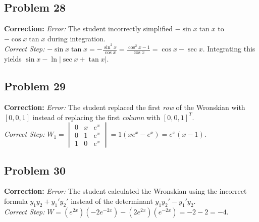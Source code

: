 \documentclass[11pt]{article}
\begin{document}
\subsection*{Problem 28}
\textbf{Correction:} \textit{Error:} The student incorrectly simplified $-\sin x \tan x$ to $-\cos x \tan x$ during integration. \\
\textit{Correct Step:} $-\sin x \tan x = -\frac{\sin^2 x}{\cos x} = \frac{\cos^2 x - 1}{\cos x} = \cos x - \sec x$. Integrating this yields $\sin x - \ln|\sec x + \tan x|$.

\subsection*{Problem 29}
\textbf{Correction:} \textit{Error:} The student replaced the first \textit{row} of the Wronskian with $[0, 0, 1]$ instead of replacing the first \textit{column} with $[0, 0, 1]^T$. \\
\textit{Correct Step:} $W_1 = \begin{vmatrix} 0 & x & e^x \\ 0 & 1 & e^x \\ 1 & 0 & e^x \end{vmatrix} = 1(xe^x - e^x) = e^x(x-1)$.

\subsection*{Problem 30}
\textbf{Correction:} \textit{Error:} The student calculated the Wronskian using the incorrect formula $y_1 y_2 + y_1' y_2'$ instead of the determinant $y_1 y_2' - y_1' y_2$. \\
\textit{Correct Step:} $W = (e^{2x})(-2e^{-2x}) - (2e^{2x})(e^{-2x}) = -2 - 2 = -4$.
\end{document}
